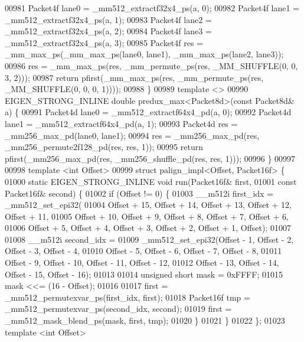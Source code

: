 \begin{DoxyCode}
00981   Packet4f lane0 = \_mm512\_extractf32x4\_ps(a, 0);
00982   Packet4f lane1 = \_mm512\_extractf32x4\_ps(a, 1);
00983   Packet4f lane2 = \_mm512\_extractf32x4\_ps(a, 2);
00984   Packet4f lane3 = \_mm512\_extractf32x4\_ps(a, 3);
00985   Packet4f res = \_mm\_max\_ps(\_mm\_max\_ps(lane0, lane1), \_mm\_max\_ps(lane2, lane3));
00986   res = \_mm\_max\_ps(res, \_mm\_permute\_ps(res, \_MM\_SHUFFLE(0, 0, 3, 2)));
00987   \textcolor{keywordflow}{return} pfirst(\_mm\_max\_ps(res, \_mm\_permute\_ps(res, \_MM\_SHUFFLE(0, 0, 0, 1))));
00988 \}
00989 \textcolor{keyword}{template} <>
00990 EIGEN\_STRONG\_INLINE \textcolor{keywordtype}{double} predux\_max<Packet8d>(\textcolor{keyword}{const} Packet8d& a) \{
00991   Packet4d lane0 = \_mm512\_extractf64x4\_pd(a, 0);
00992   Packet4d lane1 = \_mm512\_extractf64x4\_pd(a, 1);
00993   Packet4d res = \_mm256\_max\_pd(lane0, lane1);
00994   res = \_mm256\_max\_pd(res, \_mm256\_permute2f128\_pd(res, res, 1));
00995   \textcolor{keywordflow}{return} pfirst(\_mm256\_max\_pd(res, \_mm256\_shuffle\_pd(res, res, 1)));
00996 \}
00997 
00998 \textcolor{keyword}{template} <\textcolor{keywordtype}{int} Offset>
00999 \textcolor{keyword}{struct }palign\_impl<Offset, Packet16f> \{
01000   \textcolor{keyword}{static} EIGEN\_STRONG\_INLINE \textcolor{keywordtype}{void} run(Packet16f& first,
01001                                       \textcolor{keyword}{const} Packet16f& second) \{
01002     \textcolor{keywordflow}{if} (Offset != 0) \{
01003       \_\_m512i first\_idx = \_mm512\_set\_epi32(
01004           Offset + 15, Offset + 14, Offset + 13, Offset + 12, Offset + 11,
01005           Offset + 10, Offset + 9, Offset + 8, Offset + 7, Offset + 6,
01006           Offset + 5, Offset + 4, Offset + 3, Offset + 2, Offset + 1, Offset);
01007 
01008       \_\_m512i second\_idx =
01009           \_mm512\_set\_epi32(Offset - 1, Offset - 2, Offset - 3, Offset - 4,
01010                            Offset - 5, Offset - 6, Offset - 7, Offset - 8,
01011                            Offset - 9, Offset - 10, Offset - 11, Offset - 12,
01012                            Offset - 13, Offset - 14, Offset - 15, Offset - 16);
01013 
01014       \textcolor{keywordtype}{unsigned} \textcolor{keywordtype}{short} mask = 0xFFFF;
01015       mask <<= (16 - Offset);
01016 
01017       first = \_mm512\_permutexvar\_ps(first\_idx, first);
01018       Packet16f tmp = \_mm512\_permutexvar\_ps(second\_idx, second);
01019       first = \_mm512\_mask\_blend\_ps(mask, first, tmp);
01020     \}
01021   \}
01022 \};
01023 \textcolor{keyword}{template} <\textcolor{keywordtype}{int} Offset>

\end{DoxyCode}
